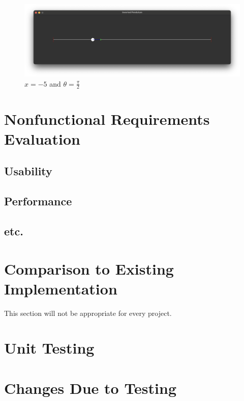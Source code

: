 \documentclass[12pt, titlepage]{article}
\begin{document}
\begin{figure}[h!]
  \begin{center}
    \includegraphics[width=\textwidth]{test_vis_1_4.png}
  \end{center}
  \caption{$x=-5$ and $\theta=\frac{\pi}{2}$}
  \label{fig:test_vis_1_4}
\end{figure}

\newpage

\section{Nonfunctional Requirements Evaluation}

\subsection{Usability}
		
\subsection{Performance}

\subsection{etc.}
	
\section{Comparison to Existing Implementation}	

This section will not be appropriate for every project.

\section{Unit Testing}

\section{Changes Due to Testing}
\end{document}
